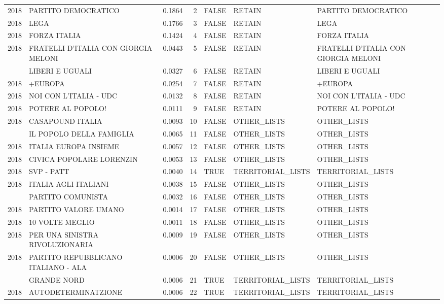 \begin{longtable}[t]{rlrrlll}
2018 & PARTITO DEMOCRATICO & 0.1864 & 2 & FALSE & RETAIN & PARTITO DEMOCRATICO\\
2018 & LEGA & 0.1766 & 3 & FALSE & RETAIN & LEGA\\
2018 & FORZA ITALIA & 0.1424 & 4 & FALSE & RETAIN & FORZA ITALIA\\
2018 & FRATELLI D'ITALIA CON GIORGIA MELONI & 0.0443 & 5 & FALSE & RETAIN & FRATELLI D'ITALIA CON GIORGIA MELONI\\
\addlinespace
2018 & LIBERI E UGUALI & 0.0327 & 6 & FALSE & RETAIN & LIBERI E UGUALI\\
2018 & +EUROPA & 0.0254 & 7 & FALSE & RETAIN & +EUROPA\\
2018 & NOI CON L'ITALIA - UDC & 0.0132 & 8 & FALSE & RETAIN & NOI CON L'ITALIA - UDC\\
2018 & POTERE AL POPOLO! & 0.0111 & 9 & FALSE & RETAIN & POTERE AL POPOLO!\\
2018 & CASAPOUND ITALIA & 0.0093 & 10 & FALSE & OTHER\_LISTS & OTHER\_LISTS\\
\addlinespace
2018 & IL POPOLO DELLA FAMIGLIA & 0.0065 & 11 & FALSE & OTHER\_LISTS & OTHER\_LISTS\\
2018 & ITALIA EUROPA INSIEME & 0.0057 & 12 & FALSE & OTHER\_LISTS & OTHER\_LISTS\\
2018 & CIVICA POPOLARE LORENZIN & 0.0053 & 13 & FALSE & OTHER\_LISTS & OTHER\_LISTS\\
2018 & SVP - PATT & 0.0040 & 14 & TRUE & TERRITORIAL\_LISTS & TERRITORIAL\_LISTS\\
2018 & ITALIA AGLI ITALIANI & 0.0038 & 15 & FALSE & OTHER\_LISTS & OTHER\_LISTS\\
\addlinespace
2018 & PARTITO COMUNISTA & 0.0032 & 16 & FALSE & OTHER\_LISTS & OTHER\_LISTS\\
2018 & PARTITO VALORE UMANO & 0.0014 & 17 & FALSE & OTHER\_LISTS & OTHER\_LISTS\\
2018 & 10 VOLTE MEGLIO & 0.0011 & 18 & FALSE & OTHER\_LISTS & OTHER\_LISTS\\
2018 & PER UNA SINISTRA RIVOLUZIONARIA & 0.0009 & 19 & FALSE & OTHER\_LISTS & OTHER\_LISTS\\
2018 & PARTITO REPUBBLICANO ITALIANO - ALA & 0.0006 & 20 & FALSE & OTHER\_LISTS & OTHER\_LISTS\\
\addlinespace
2018 & GRANDE NORD & 0.0006 & 21 & TRUE & TERRITORIAL\_LISTS & TERRITORIAL\_LISTS\\
2018 & AUTODETERMINATZIONE & 0.0006 & 22 & TRUE & TERRITORIAL\_LISTS & TERRITORIAL\_LISTS\\

\end{longtable}
